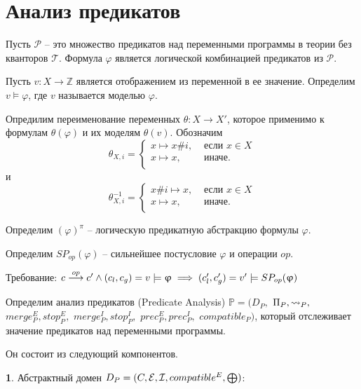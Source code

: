 \section{Анализ предикатов}
\label{sect_predicate_analysis}
Пусть $\mathscr{P}$ -- это множество предикатов над переменными программы в теории без кванторов $\mathscr{T}$.
Формула $\varphi$ является логической комбинацией предикатов из $\mathscr{P}$.

Пусть $v: X \to \mathbb{Z}$ является отображением из переменной в ее значение.
Определим $v \models \varphi$, где $v$ называется моделью $\varphi$.

Опредилим переименование переменных $\theta: X \to X'$, которое применимо к формулам $\theta(\varphi)$ и их моделям $\theta(v)$.
Обозначим
$$\theta_{X,i}= 
\left\lbrace\begin{array}{ll}
x \mapsto x\#i, & \mbox{ если } x \in X\\
x \mapsto x, &\mbox{ иначе}.\\
\end{array}
\right.
$$
и
$$\theta_{X,i}^{-1}= 
\left\lbrace\begin{array}{ll}
x\#i \mapsto x, & \mbox{ если } x \in X\\
x \mapsto x, &\mbox{ иначе}.\\
\end{array}
\right.
$$

Определим $(\varphi)^\pi$ -- логическую предикатную абстракцию формулы $\varphi$.

Определим $SP_{op}(\varphi)$ -- сильнейшее постусловие $\varphi$ и операции $op$.

Требование: $c \stackrel{op}{\longrightarrow} c' \land (c_l, c_g) = v \models \upvarphi \implies (c_l', c_g') = v' \models SP_{op}(\upvarphi)$

Определим анализ предикатов (Predicate Analysis) $\mathbb{P}=(D_{P},$ $\Pi_{P}, \leadsto_{P},$ $merge^E_{P}, stop^E_{P},$ $merge^I_{P}, stop^I_{P},$ $prec^E_{P},prec^I_{P},$ $compatible_{P})$, который отслеживает значение предикатов над переменными программы.

Он состоит из следующий компонентов.

{\textbf 1.} Абстрактный домен $D_{P}=(C, \mathcal{E}, \mathcal{I}, compatible^E, \mathrel{\bigoplus})$:

